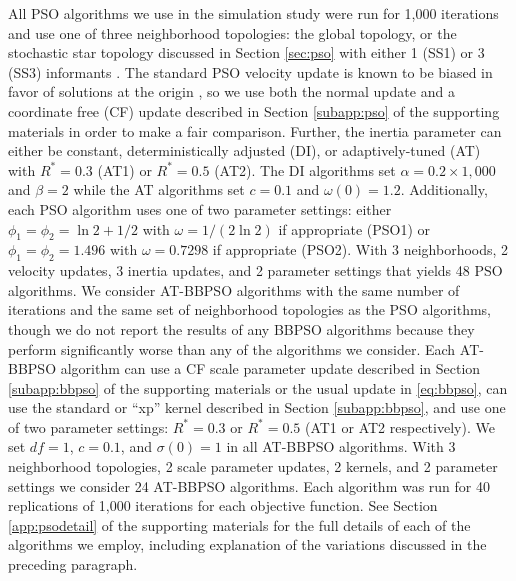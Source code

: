 \documentclass[cmbright]{staauth}
\begin{document}
All PSO algorithms we use in the simulation study were run for 1,000 iterations and use one of three neighborhood topologies: the global topology, or the stochastic star topology discussed in Section \ref{sec:pso} with either 1 (SS1) or 3 (SS3) informants \cite{miranda2008stochastic}. The standard PSO velocity update is known to be biased in favor of solutions at the origin \cite[e.g.][]{monson2005exposing, spears2010biases}, so we use both the normal update and a coordinate free (CF) update described in Section \ref{subapp:pso} of the supporting materials in order to make a fair comparison. Further, the inertia parameter can either be constant, deterministically adjusted (DI), or adaptively-tuned (AT) with $R^*=0.3$ (AT1) or $R^*=0.5$ (AT2). The DI algorithms set $\alpha=0.2\times 1,000$ and $\beta=2$ while the AT algorithms set $c=0.1$ and $\omega(0)=1.2$. Additionally, each PSO algorithm uses one of two parameter settings: either $\phi_1=\phi_2=\ln2 + 1/2$ with $\omega=1/(2\ln2)$ if appropriate (PSO1) or $\phi_1=\phi_2=1.496$ with $\omega=0.7298$ if appropriate (PSO2). With 3 neighborhoods, 2 velocity updates, 3 inertia updates, and 2 parameter settings that yields 48 PSO algorithms. We consider AT-BBPSO algorithms with the same number of iterations and the same set of neighborhood topologies as the PSO algorithms, though we do not report the results of any BBPSO algorithms because they perform significantly worse than any of the algorithms we consider. Each AT-BBPSO algorithm can use a CF scale parameter update described in Section \ref{subapp:bbpso} of the supporting materials or the usual update in \eqref{eq:bbpso}, can use the standard or ``xp'' kernel described in Section \ref{subapp:bbpso}, and use one of two parameter settings: $R^*=0.3$ or $R^*=0.5$ (AT1 or AT2 respectively). We set $df=1$, $c=0.1$, and $\sigma(0)=1$ in all AT-BBPSO algorithms. With 3 neighborhood topologies, 2 scale parameter updates, 2 kernels, and 2 parameter settings we consider 24 AT-BBPSO algorithms. Each algorithm was run for 40 replications of 1,000 iterations for each objective function. See Section \ref{app:psodetail} of the supporting materials for the full details of each of the algorithms we employ, including explanation of the variations discussed in the preceding paragraph.
\end{document}
